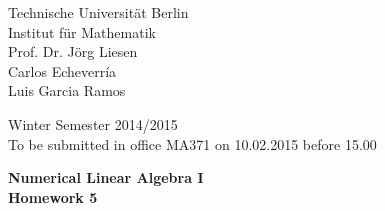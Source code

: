 \documentclass[10pt]{report}
\begin{document}
\begin{minipage}[t]{0.58\textwidth}
Technische Universit\"at Berlin\\
Institut f\"ur Mathematik\\
Prof. Dr. J\"org Liesen\\
Carlos Echeverr\'ia\\
Luis Garcia Ramos
\end{minipage}
\hfill
\begin{minipage}[t]{0.48\textwidth}
\begin{flushright}
Winter Semester 2014/2015\\
To be submitted in office MA371 on 10.02.2015 before 15.00
\end{flushright}
\end{minipage}
\begin{center}
\textbf{{Numerical Linear Algebra I}}\\
\textbf{Homework 5}
\end{center}
\thispagestyle{empty}
\vspace{0cm}
\end{document}
